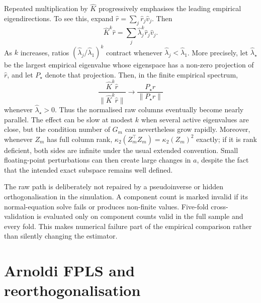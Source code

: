 Repeated multiplication by $\widehat K$ progressively emphasises the
leading empirical eigendirections.  To see this, expand
$\widehat r=\sum_j\widehat r_j\widehat v_j$.  Then
\begin{equation}
    \widehat K^k\widehat r
    =\sum_j\widehat\lambda_j^k
      \widehat r_j\widehat v_j.
    \label{eq:methods-power-eigen-expansion}
\end{equation}
As $k$ increases, ratios
$(\widehat\lambda_j/\widehat\lambda_1)^k$ contract whenever
$\widehat\lambda_j<\widehat\lambda_1$.  More precisely, let
$\widehat\lambda_\star$ be the largest empirical eigenvalue whose
eigenspace has a non-zero projection of $\widehat r$, and let
$P_\star$ denote that projection.  Then, in the finite empirical spectrum,
\[
 \frac{\widehat K^k\widehat r}{\|\widehat K^k\widehat r\|}
 \longrightarrow
 \frac{P_\star\widehat r}{\|P_\star\widehat r\|}
\]
whenever $\widehat\lambda_\star>0$.  Thus the normalised raw columns
eventually become nearly parallel.  The effect can be slow at modest $k$
when several active eigenvalues are close, but the condition number of
$G_m$ can nevertheless grow rapidly.  Moreover, whenever $Z_m$ has full
column rank,
$\kappa_2(Z_m^\top Z_m)=\kappa_2(Z_m)^2$ exactly; if it is rank deficient,
both sides are infinite under the usual extended convention.  Small
floating-point perturbations can then create large changes in $a$, despite
the fact that the intended exact subspace remains well defined.

The raw path is deliberately not repaired by a pseudoinverse or hidden
orthogonalisation in the simulation.  A component count is marked
invalid if its normal-equation solve fails or produces non-finite values.
Five-fold cross-validation is evaluated only on component counts valid in
the full sample and every fold.  This makes numerical failure part of the
empirical comparison rather than silently changing the estimator.

\section{Arnoldi FPLS and reorthogonalisation}
\label{sec:methods-arnoldi}

